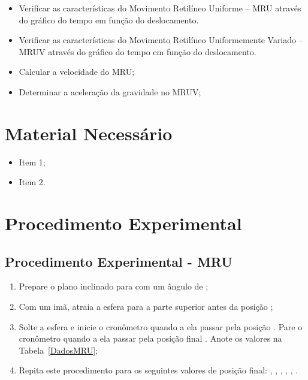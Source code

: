\begin{itemize}
     \item Verificar as características do Movimento Retilíneo Uniforme -- MRU através do gráfico do tempo em função do deslocamento.
     \item Verificar as características do Movimento Retilíneo Uniformemente Variado -- MRUV através do gráfico do tempo em função do deslocamento.
     \item Calcular a velocidade do MRU;
     \item Determinar a aceleração da gravidade no MRUV;
\end{itemize}

\section{Material Necessário}

\begin{itemize}
	\item Item 1;
	\item Item 2.
\end{itemize}

\section{Procedimento Experimental}

\subsection{Procedimento Experimental - MRU}

\begin{enumerate}
	\item Prepare o plano inclinado para com um ângulo de ;
	\item Com um imã, atraia a esfera para a parte superior antes da posição ;
	\item Solte a esfera e inicie o cronômetro quando a ela passar pela posição . Pare o cronômetro quando a ela passar pela posição final . Anote os valores na Tabela~\ref{DadosMRU};
	\item Repita este procedimento para os seguintes valores de posição final: , , , , , .
\end{enumerate}

